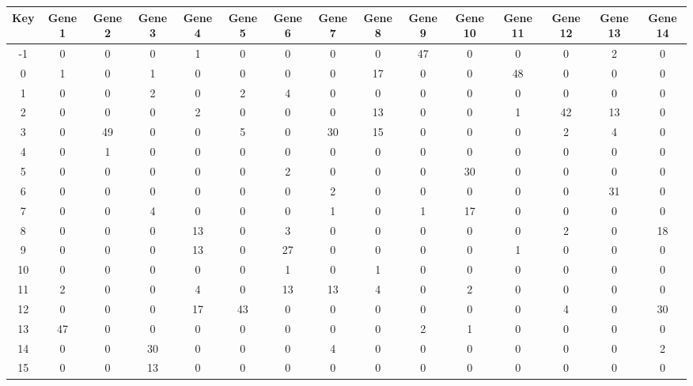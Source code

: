 \begin{tabular}{|c|c|c|c|c|c|c|c|c|c|c|c|c|c|c|}
\hline
Key & Gene 1 & Gene 2 & Gene 3 & Gene 4 & Gene 5 & Gene 6 & Gene 7 & Gene 8 & Gene 9 & Gene 10 & Gene 11 & Gene 12 & Gene 13 & Gene 14 \\
\hline
-1 & 0 & 0 & 0 & 1 & 0 & 0 & 0 & 0 & 47 & 0 & 0 & 0 & 2 & 0 \\
0 & 1 & 0 & 1 & 0 & 0 & 0 & 0 & 17 & 0 & 0 & 48 & 0 & 0 & 0 \\
1 & 0 & 0 & 2 & 0 & 2 & 4 & 0 & 0 & 0 & 0 & 0 & 0 & 0 & 0 \\
2 & 0 & 0 & 0 & 2 & 0 & 0 & 0 & 13 & 0 & 0 & 1 & 42 & 13 & 0 \\
3 & 0 & 49 & 0 & 0 & 5 & 0 & 30 & 15 & 0 & 0 & 0 & 2 & 4 & 0 \\
4 & 0 & 1 & 0 & 0 & 0 & 0 & 0 & 0 & 0 & 0 & 0 & 0 & 0 & 0 \\
5 & 0 & 0 & 0 & 0 & 0 & 2 & 0 & 0 & 0 & 30 & 0 & 0 & 0 & 0 \\
6 & 0 & 0 & 0 & 0 & 0 & 0 & 2 & 0 & 0 & 0 & 0 & 0 & 31 & 0 \\
7 & 0 & 0 & 4 & 0 & 0 & 0 & 1 & 0 & 1 & 17 & 0 & 0 & 0 & 0 \\
8 & 0 & 0 & 0 & 13 & 0 & 3 & 0 & 0 & 0 & 0 & 0 & 2 & 0 & 18 \\
9 & 0 & 0 & 0 & 13 & 0 & 27 & 0 & 0 & 0 & 0 & 1 & 0 & 0 & 0 \\
10 & 0 & 0 & 0 & 0 & 0 & 1 & 0 & 1 & 0 & 0 & 0 & 0 & 0 & 0 \\
11 & 2 & 0 & 0 & 4 & 0 & 13 & 13 & 4 & 0 & 2 & 0 & 0 & 0 & 0 \\
12 & 0 & 0 & 0 & 17 & 43 & 0 & 0 & 0 & 0 & 0 & 0 & 4 & 0 & 30 \\
13 & 47 & 0 & 0 & 0 & 0 & 0 & 0 & 0 & 2 & 1 & 0 & 0 & 0 & 0 \\
14 & 0 & 0 & 30 & 0 & 0 & 0 & 4 & 0 & 0 & 0 & 0 & 0 & 0 & 2 \\
15 & 0 & 0 & 13 & 0 & 0 & 0 & 0 & 0 & 0 & 0 & 0 & 0 & 0 & 0 \\
\hline
\end{tabular}
